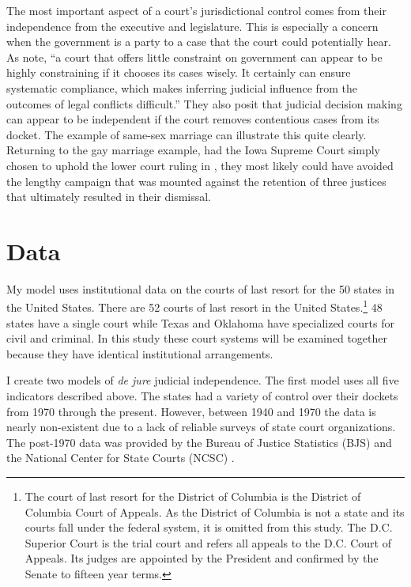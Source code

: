 \documentclass[12pt]{article}
\begin{document}
The most important aspect of a court's jurisdictional control comes from their independence from the executive and legislature.  This is especially a concern when the government is a party to a case that the court could potentially hear.  As \citet[6]{Rios2014} note, ``a court that offers little constraint on government can appear to be highly constraining if it chooses its cases wisely. It certainly can ensure systematic compliance, which makes inferring judicial influence from the outcomes of legal conflicts difficult.''  They also posit that judicial decision making can appear to be independent if the court removes contentious cases from its docket.  The example of same-sex marriage can illustrate this quite clearly.  Returning to the gay marriage example, had the Iowa Supreme Court simply chosen to uphold the lower court ruling in \cite{iowagay}, they most likely could have avoided the lengthy campaign that was mounted against the retention of three justices that ultimately resulted in their dismissal.

\section{Data}\label{Methods}
My model uses institutional data on the courts of last resort for the 50 states in the United States.  There are 52 courts of last resort in the United States.\footnote{The court of last resort for the District of Columbia is the District of Columbia Court of Appeals.  As the District of Columbia is not a state and its courts fall under the federal system, it is omitted from this study.  The D.C. Superior Court is the trial court and refers all appeals to the D.C. Court of Appeals.  Its judges are appointed by the President and confirmed by the Senate to fifteen year terms.}  48 states have a single court while Texas and Oklahoma have specialized courts for civil and criminal.  In this study these court systems will be examined together because they have identical institutional arrangements.  

I create two models of \textit{de jure} judicial independence.  The first model uses all five indicators described above.  The states had a variety of control over their dockets from 1970 through the present.  However, between 1940 and 1970 the data is nearly non-existent due to a lack of reliable surveys of state court organizations.  The post-1970 data was provided by the Bureau of Justice Statistics (BJS) and the National Center for State Courts (NCSC) \citep{BJS1993,BJS1998,BJS2004}.  
\end{document}

